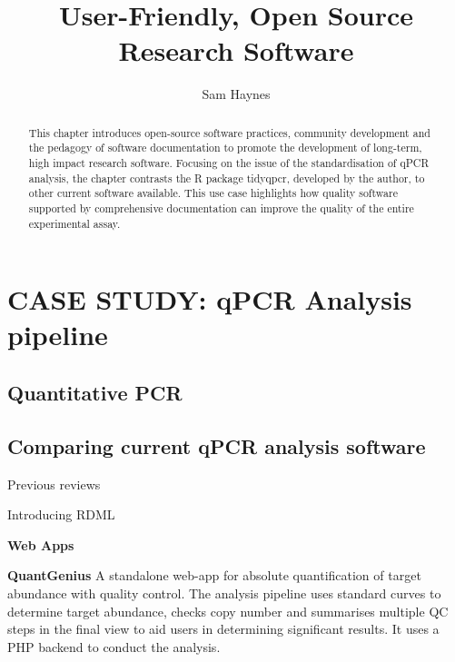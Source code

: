 \documentclass{SBCbookchapter}
\author{Sam Haynes}
\title{User-Friendly, Open Source Research Software}
\begin{document}
\maketitle

\begin{abstract}
This chapter introduces open-source software practices, community development and the pedagogy of software documentation to promote the development of long-term, high impact research software. Focusing on the issue of the standardisation of qPCR analysis, the chapter contrasts the R package tidyqpcr, developed by the author, to other current software available. This use case highlights how quality software supported by comprehensive documentation can improve the quality of the entire experimental assay.


\end{abstract}

\section{CASE STUDY: qPCR Analysis pipeline}

\subsection{Quantitative PCR}

\subsection{Comparing current qPCR analysis software}

Previous reviews \cite{Rodiger2015, Pabinger2014}

Introducing RDML \cite{Rodiger2017}



\textbf{Web Apps}

\textbf{QuantGenius} A standalone web-app for absolute quantification of target abundance with quality control. The analysis pipeline uses standard curves to determine target abundance, checks copy number and summarises multiple QC steps in the final view to aid users in determining significant results. It uses a PHP backend to conduct the analysis.   \cite{Baebler2017}
\end{document}

